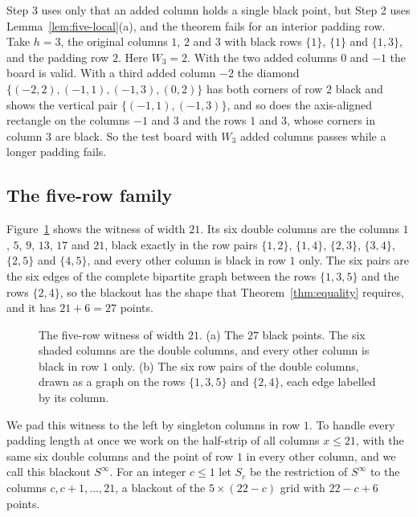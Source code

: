 \begin{remark}\label{rem:interior}
Step 3 uses only that an added column holds a single black point, but Step 2 uses
Lemma~\ref{lem:five-local}(a), and the theorem fails for an interior padding row. Take
$h=3$, the original columns $1$, $2$ and $3$ with black rows $\{1\}$, $\{1\}$ and
$\{1,3\}$, and the padding row $2$. Here $W_3=2$. With the two added columns $0$ and $-1$
the board is valid. With a third added column $-2$ the diamond
$\{(-2,2),(-1,1),(-1,3),(0,2)\}$ has both corners of row $2$ black and shows the vertical
pair $\{(-1,1),(-1,3)\}$, and so does the axis-aligned rectangle on the columns $-1$ and $3$
and the rows $1$ and $3$, whose corners in column $3$ are black. So the test board with
$W_3$ added columns passes while a longer padding fails.
\end{remark}

\subsection{The five-row family}

Figure~\ref{fig:witness21} shows the witness of width $21$. Its six double columns are the
columns $1$, $5$, $9$, $13$, $17$ and $21$, black exactly in the row pairs $\{1,2\}$,
$\{1,4\}$, $\{2,3\}$, $\{3,4\}$, $\{2,5\}$ and $\{4,5\}$, and every other column is black
in row $1$ only. The six pairs are the six edges of the complete bipartite graph between the
rows $\{1,3,5\}$ and the rows $\{2,4\}$, so the blackout has the shape that
Theorem~\ref{thm:equality} requires, and it has $21+6=27$ points.

\begin{figure}[t]
\centering

\caption{The five-row witness of width $21$. (a) The $27$ black points. The six shaded
columns are the double columns, and every other column is black in row $1$ only. (b) The six
row pairs of the double columns, drawn as a graph on the rows $\{1,3,5\}$ and $\{2,4\}$, each
edge labelled by its column.}
\label{fig:witness21}
\end{figure}

We pad this witness to the left by singleton columns in row $1$. To handle every padding
length at once we work on the half-strip of all columns $x\le21$, with the same six double
columns and the point of row $1$ in every other column, and we call this blackout $S^{\infty}$.
For an integer $c\le1$ let $S_c$ be the restriction of $S^{\infty}$ to the columns
$c,c+1,\dots,21$, a blackout of the $5\times(22-c)$ grid with $22-c+6$ points.

